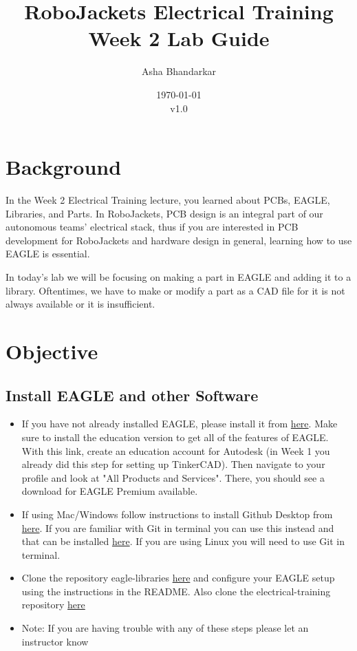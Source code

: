 \documentclass{article}
\title{RoboJackets Electrical Training Week 2 Lab Guide}
\author{Asha Bhandarkar}
\date{\today\\v1.0}
\begin{document}
\maketitle{}
\setcounter{tocdepth}{2}
\tableofcontents
\pagebreak


\section{Background}
In the Week 2 Electrical Training lecture, you learned about PCBs, EAGLE, Libraries, and Parts. In RoboJackets, PCB design is an integral part of our autonomous teams' electrical stack, thus if you are interested in PCB development for RoboJackets and hardware design in general, learning how to use EAGLE is essential.

In today's lab we will be focusing on making a part in EAGLE and adding it to a library. Oftentimes, we have to make or modify a part as a CAD file for it is not always available or it is insufficient. 

\section{Objective}
\subsection{Install EAGLE and other Software}
\begin{itemize}
    \item If you have not already installed EAGLE, please install it from \href{https://www.autodesk.com/education/free-software/eagle}{here}. Make sure to install the education version to get all of the features of EAGLE. With this link, create an education account for Autodesk (in Week 1 you already did this step for setting up TinkerCAD). Then navigate to your profile and look at "All Products and Services". There, you should see a download for EAGLE Premium available.
    \item If using Mac/Windows follow instructions to install Github Desktop from \href{https://docs.github.com/en/desktop/getting-started-with-github-desktop/installing-github-desktop}{here}. If you are familiar with Git in terminal you can use this instead and that can be installed \href{https://git-scm.com/book/en/v2/Getting-Started-Installing-Git}{here}. If you are using Linux you will need to use Git in terminal. 
    \item Clone the repository eagle-libraries \href{https://github.com/RoboJackets/eagle-libraries}{here} and configure your EAGLE setup using the instructions in the README. Also clone the electrical-training repository \href{https://github.com/RoboJackets/electrical-training/tree/master}{here}
    \item Note: If you are having trouble with any of these steps please let an instructor know
\end{itemize}
\end{document}
